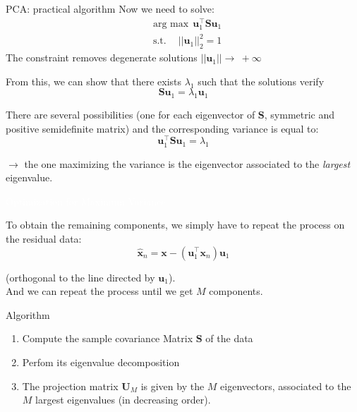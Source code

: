 \documentclass{beamer}
\begin{document}
\begin{frame}{PCA: practical algorithm}
Now we need to solve:
\begin{align*}
& \textrm{arg max} \ \  \mathbf{u}_{1}^{\top}\mathbf{S}\mathbf{u}_{1}\\
& \textrm{s.t.} \ \quad ||\mathbf{u}_{1}||_{2}^{2} = 1
\end{align*}
The constraint removes degenerate solutions $||\mathbf{u}_{1}|| \rightarrow \ +\infty$\\
\vspace{0.2cm}

From this, we can show that there exists $\lambda_{1}$ such that the solutions verify
\begin{equation*}
\mathbf{S}\mathbf{u}_{1} = \lambda_{1} \mathbf{u}_{1}
\end{equation*}

There are several possibilities (one for each eigenvector of $\mathbf{S}$, symmetric and positive semidefinite matrix) and the corresponding variance is equal to:
\begin{equation*}
\mathbf{u}_{1}^{\top}\mathbf{S}\mathbf{u}_{1} = \lambda_{1}
\end{equation*}

$\rightarrow$  the one maximizing the variance is the eigenvector associated to the \emph{largest} eigenvalue.

\end{frame}

\begin{frame}{\textcolor{white}{Optimization for Maximum Variance}}

To obtain the remaining components, we simply have to repeat the process on the residual data:
\begin{equation*}
\hat{\mathbf{x}}_{n} = \mathbf{x} - (\mathbf{u}_{1}^{\top}\mathbf{x}_{n})\mathbf{u}_{1}
\end{equation*}

(orthogonal to the line directed by $\mathbf{u}_{1}$).\\
\vspace{0.25cm}
And we can repeat the process until we get $M$ components.

\begin{block}{Algorithm}
\begin{enumerate}
\item Compute the sample covariance Matrix $\mathbf{S}$ of the data
\item Perfom its eigenvalue decomposition
\item The projection matrix $\mathbf{U}_{M}$ is given by the $M$ eigenvectors, associated to the $M$ largest eigenvalues (in decreasing order).
\end{enumerate}
\end{block}

\end{frame}
\end{document}
